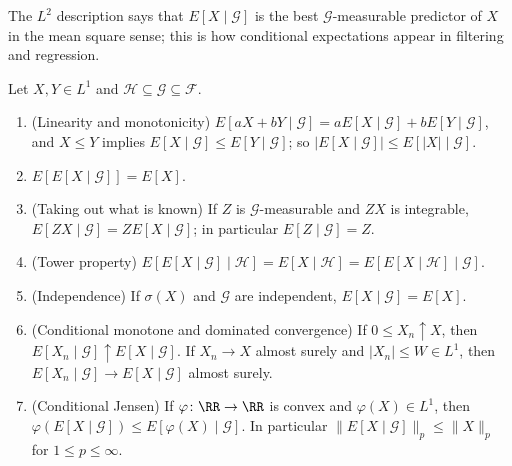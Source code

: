 The $L^2$ description says that $E[X \mid \mathcal{G}]$ is the best $\mathcal{G}$-measurable predictor of $X$ in the mean square sense; this is how conditional expectations appear in filtering and regression.

\begin{proposition}\label{martingales:proposition-conditional-expectation-properties}
Let $X, Y \in L^1$ and $\mathcal{H} \subseteq \mathcal{G} \subseteq \mathcal{F}$.
\begin{enumerate}
\item (Linearity and monotonicity) $E[aX + bY \mid \mathcal{G}] = aE[X \mid \mathcal{G}] + bE[Y \mid \mathcal{G}]$, and $X \leq Y$ implies $E[X \mid \mathcal{G}] \leq E[Y \mid \mathcal{G}]$; so $|E[X \mid \mathcal{G}]| \leq E[|X| \mid \mathcal{G}]$.
\item $E[E[X \mid \mathcal{G}]] = E[X]$.
\item (Taking out what is known) If $Z$ is $\mathcal{G}$-measurable and $ZX$ is integrable, $E[ZX \mid \mathcal{G}] = ZE[X \mid \mathcal{G}]$; in particular $E[Z \mid \mathcal{G}] = Z$.
\item (Tower property) $E[E[X \mid \mathcal{G}] \mid \mathcal{H}] = E[X \mid \mathcal{H}] = E[E[X \mid \mathcal{H}] \mid \mathcal{G}]$.
\item (Independence) If $\sigma(X)$ and $\mathcal{G}$ are independent, $E[X \mid \mathcal{G}] = E[X]$.
\item (Conditional monotone and dominated convergence) If $0 \leq X_n \uparrow X$, then $E[X_n \mid \mathcal{G}] \uparrow E[X \mid \mathcal{G}]$. If $X_n \to X$ almost surely and $|X_n| \leq W \in L^1$, then
$E[X_n \mid \mathcal{G}] \to E[X \mid \mathcal{G}]$ almost surely.
\item (Conditional Jensen) If $\varphi \colon \RR \to \RR$ is convex and $\varphi(X) \in L^1$, then $\varphi(E[X \mid \mathcal{G}]) \leq E[\varphi(X) \mid \mathcal{G}]$. In particular $\|E[X \mid \mathcal{G}]\|_p \leq \|X\|_p$ for $1 \leq p \leq \infty$.
\end{enumerate}
\end{proposition}

